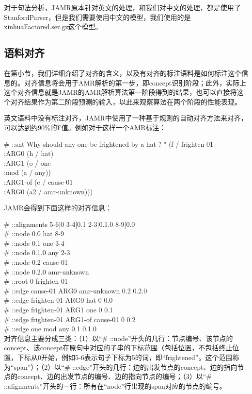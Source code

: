 \documentclass[master, winfont]{njuthesis}
\begin{document}
对于句法分析，JAMR原本针对英文的处理，和我们对中文的处理，都是使用了StanfordParser，但是我们需要使用中文的模型，我们使用的是xinhuaFactored.ser.gz这个模型。

\subsection{语料对齐}
\label{subsection:dataalign}
在第\label{subsection:aligndata}小节，我们详细介绍了对齐的含义，以及有对齐的标注语料是如何标注这个信息的。对齐信息将会用于AMR解析的第一步，即concept识别阶段；此外，实际上这个对齐信息就是JAMR的AMR解析算法第一阶段得到的结果，也可以直接将这个对齐结果作为第二阶段预测的输入，以此来观察算法在两个阶段的性能表现。

英文语料中没有标注对齐，JAMR中使用了一种基于规则的自动对齐方法来对齐，可以达到约90\%的F值\cite{Flanigan2014}。例如对于这样一个AMR标注：

# ::snt Why should any one be frightened by a hat ? "
(f / frighten-01 \\
  :ARG0 (h / hat) \\
  :ARG1 (o / one \\ 
          :mod (a / any)) \\
  :ARG1-of (c / cause-01 \\
             :ARG0 (a2 / amr-unknown)))

JAMR会得到下面这样的对齐信息：

# ::alignments 5-6|0 3-4|0.1 2-3|0.1.0 8-9|0.0 \\
# ::node	0.0	hat	8-9  \\
# ::node	0.1	one	3-4  \\
# ::node	0.1.0	any	2-3  \\
# ::node	0.2	cause-01	  \\
# ::node	0.2.0	amr-unknown  \\	
# ::root	0	frighten-01 \\
# ::edge	cause-01	ARG0	amr-unknown	0.2	0.2.0	\\
# ::edge	frighten-01	ARG0	hat	0	0.0	 \\
# ::edge	frighten-01	ARG1	one	0	0.1	 \\
# ::edge	frighten-01	ARG1-of	cause-01	0	0.2	 \\
# ::edge	one	mod	any	0.1	0.1.0	 \\

对齐信息主要分成三类：（1）以“# ::node”开头的几行：节点编号、该节点的concept、该concept在原句中对应的子串的下标范围（包括位置，不包括终止位置，下标从0开始，例如5-6表示句子下标为5的词，即“frightened”。这个范围称为“span”）；（2）以“# ::edge”开头的几行：边的出发节点的concept、边的指向节点的concept、边的出发节点的编号、边的指向节点的编号；（3）以“# ::alignments”开头的一行：所有在“node”行出现的span对应的节点的编号。
\end{document}
